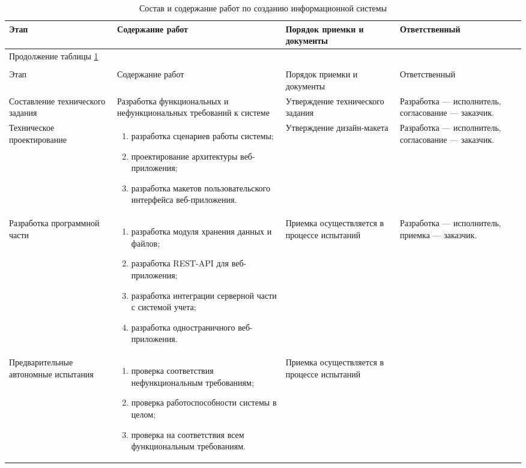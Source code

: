 \begin{center}
\begin{longtable}{|p{3.9cm}|p{4.4cm}|p{3cm}|p{3.4cm}|}
\caption{Состав и содержание работ по созданию информационной системы}
\label{tab:scopework}
\hline
Этап & Содержание работ & Порядок приемки и документы & Ответственный \\
\endfirsthead
\multicolumn{4}{l}{Продолжение таблицы \ref{tab:scopework}} \\
\multicolumn{4}{l}{} \\
\hline
Этап & Содержание работ & Порядок приемки и документы & Ответственный \\
\endhead
\hline
Составление технического задания&
Разработка функциональных и нефункциональных требований к системе&
Утверждение технического задания&
Разработка — исполнитель, согласование — заказчик.\\
\hline
Техническое проектирование&
\begin{enumerate} 
  \item разработка сценариев работы системы;
  \item проектирование архитектуры веб-приложения;
  \item разработка макетов пользовательского интерфейса веб-приложения.
\end{enumerate}&
Утверждение дизайн-макета&
Разработка — исполнитель, согласование — заказчик.\\
\hline
Разработка программной части&
\begin{enumerate} 
  \item разработка модуля хранения данных и файлов;
  \item разработка REST-API для веб-приложения;
  \item разработка интеграции серверной части с системой учета;
  \item разработка одностраничного веб-приложения.
\end{enumerate}&
Приемка осуществляется в процессе испытаний&
Разработка — исполнитель, приемка — заказчик.\\
\hline
Предварительные автономные испытания&
\begin{enumerate} 
  \item проверка соответствия нефункциональным требованиям;
  \item проверка работоспособности системы в целом;
  \item проверка на соответствия всем функциональным требованиям. 
\end{enumerate}&
Приемка осуществляется в процессе испытаний&

\end{longtable}
\end{center}
